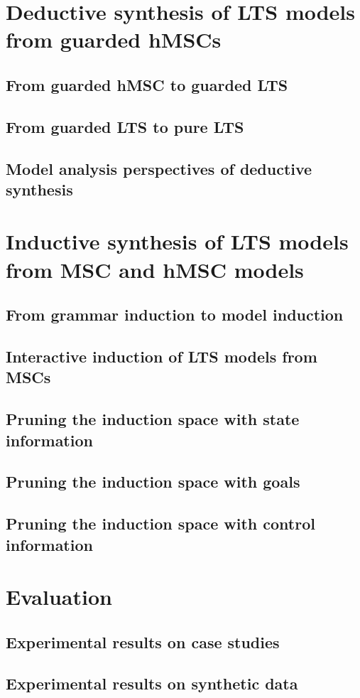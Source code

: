 \documentclass[dvips,a4paper,11pt]{report}
\begin{document}
\chapter{Deductive synthesis of LTS models from guarded hMSCs}
  \section{From guarded hMSC to guarded LTS}
  \section{From guarded LTS to pure LTS}
  \section{Model analysis perspectives of deductive synthesis}
\chapter{Inductive synthesis of LTS models from MSC and hMSC models\label{chapter:inductive-synthesis}}
  \section{From grammar induction to model induction}
  \section{Interactive induction of LTS models from MSCs}
  \section{Pruning the induction space with state information}
  \section{Pruning the induction space with goals}
  \section{Pruning the induction space with control information}
\chapter{Evaluation}
  \section{Experimental results on case studies}
  \section{Experimental results on synthetic data}
\end{document}
